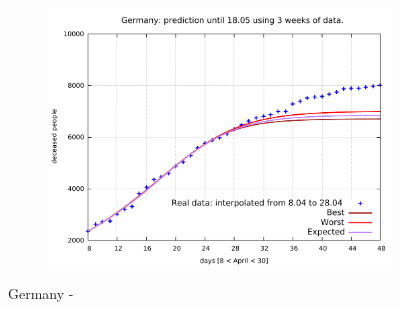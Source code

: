\documentclass[8pt]{article}
\begin{document}
\begin{figure}[h!]
\begin{subfigure}[b]{0.45\linewidth}
  \includegraphics[width=\linewidth]{../simulations_v1/de/8-28/8-28.pdf}
  \end{subfigure}
	\caption{Germany -}
\end{figure}
\end{document}
